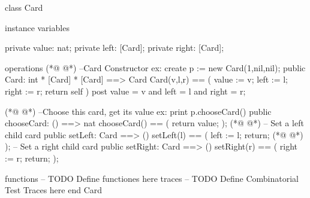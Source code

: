 \begin{vdmpp}[breaklines=true]
class Card

instance variables
  
  private value: nat;
  private left: [Card];
    private right: [Card];
          
operations
(*@
\label{Card:10}
@*)
  --Card Constructor ex: create p := new Card(1,nil,nil);
  public Card: int * [Card] * [Card] ==> Card
  Card(v,l,r) == 
  (
   value := v;
   left := l;
   right := r;
   return self
  )
  post value = v and left = l and right = r;
  
  
(*@
\label{chooseCard:22}
@*)
  --Choose this card, get its value ex: print p.chooseCard()
  public chooseCard: () ==> nat
  chooseCard() ==
  (
   return value;
  );
(*@
\label{setLeft:28}
@*)
  -- Set a left child card
  public setLeft: Card ==> ()
  setLeft(l) ==
  (
   left := l;
   return;
(*@
\label{setRight:34}
@*)
  );
  -- Set a right child card
  public setRight: Card ==> ()
  setRight(r) ==
  (
   right := r;
   return;
  );
  
  
  
functions
-- TODO Define functiones here
traces
-- TODO Define Combinatorial Test Traces here
end Card
\end{vdmpp}

